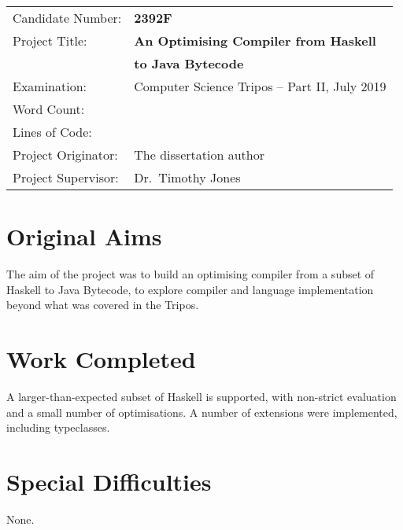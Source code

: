 \documentclass[dissertation.tex]{subfiles}
\begin{document}
{\large
\begin{tabular}{ll}
Candidate Number:   & \textbf{2392F} \\
Project Title:      & \textbf{An Optimising Compiler from Haskell} \\
                    & \textbf{to Java Bytecode} \\
Examination:        & Computer Science Tripos -- Part II, July 2019 \\
Word Count:         & \footnotemark[1] \\
Lines of Code:      & \footnotemark[2] \\
Project Originator: & The dissertation author \\
Project Supervisor: & Dr.\ Timothy Jones \\ 
\end{tabular}
}

\section*{Original Aims}
{
    The aim of the project was to build an optimising compiler from a subset of Haskell to Java Bytecode, to explore compiler and language implementation beyond what was covered in the Tripos.
}
\section*{Work Completed}
{
    A larger-than-expected subset of Haskell is supported, with non-strict evaluation and a small number of optimisations. A number of extensions were implemented, including typeclasses.
}
\section*{Special Difficulties}
{
    None.
}

\end{document}
